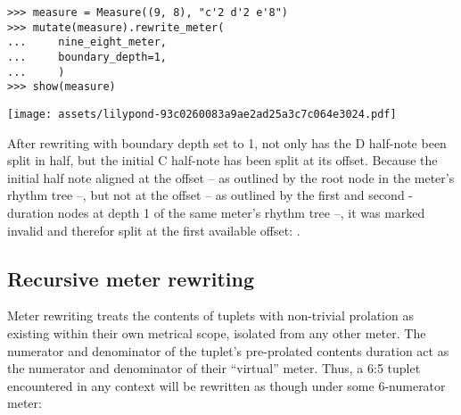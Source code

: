 \begin{abjadbookoutput}
\begin{singlespacing}
\vspace{-0.5\baselineskip}
\begin{verbatim}
>>> measure = Measure((9, 8), "c'2 d'2 e'8")
>>> mutate(measure).rewrite_meter(
...     nine_eight_meter,
...     boundary_depth=1,
...     )
>>> show(measure)
\end{verbatim}
\noindent\texttt{[image: assets/lilypond-93c0260083a9ae2ad25a3c7c064e3024.pdf]}
\end{singlespacing}
\end{abjadbookoutput}

\noindent After rewriting with boundary depth set to 1, not only has the D
half-note been split in half, but the initial C half-note has been split at its
 offset. Because the initial half note aligned at the 
offset -- as outlined by the root node in the  meter's rhythm tree
--, but not at the  offset -- as outlined by the first and second
-duration nodes at depth 1 of the same meter's rhythm tree --, it
was marked invalid and therefor split at the first available offset:
.

\subsection{Recursive meter rewriting} %
\label{ssec:recursive-meter-rewriting}

Meter rewriting treats the contents of tuplets with non-trivial prolation as
existing within their own metrical scope, isolated from any other meter. The
numerator and denominator of the tuplet's pre-prolated contents duration act as
the numerator and denominator of their \enquote{virtual} meter. Thus, a 6:5
tuplet encountered in any context will be rewritten as though under some
6-numerator meter:

\begin{comment}
<abjad>
parseable = "abj: | 4/4 c'16 ~ c'4 d'8. ~ "
parseable += "2/3 { d'8. ~ 3/5 { d'16 e'8 ~ e'16 f'16 ~ } } "
parseable += "f'4 |"
measure = parse(parseable)
show(measure)
mutate(measure).rewrite_meter(
    measure,
    boundary_depth=1,
    )
show(measure)
</abjad>
\end{comment}

